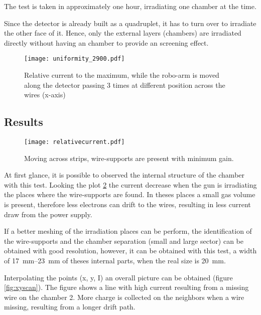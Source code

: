 The test is taken in approximately one hour, irradiating one chamber at the time.\par
Since the detector is already built as a quadruplet, it has to turn over to irradiate the other face of it. Hence, only
the external layers (chambers) are irradiated directly without having an chamber to provide an screening effect.\par

\begin{figure}[ht]
	\centering
	\texttt{[image: uniformity\_2900.pdf]}
	\caption{Relative current to the maximum, while the robo-arm is moved along the detector passing 3 times at different
	position across the wires (x-axis)}\label{}
\end{figure}


\subsection{Results}

\begin{figure}[ht]
	\centering
	\texttt{[image: relativecurrent.pdf]}
	\caption{Moving across strips, wire-supports are present with minimum gain.}\label{fig:structure}
\end{figure}

At first glance, it is possible to observed the internal structure of the chamber with this test. Looking the plot
\ref{fig:structure} the current decrease when the gun is irradiating the places where the wire-supports are found. In
theses places a small gas volume is present, therefore less electrons can drift to the wires, resulting in less current
draw from the power supply.\par
If a better meshing of the irradiation places can be perform, the identification of the wire-supports and the chamber
separation (small and large sector) can be obtained with good resolution, however, it can be obtained with this test, a
width of 
\SIrange{17}{23}{mm} of theses internal parts, when the real size is \SI{20}{mm}.\par

Interpolating the points (x, y, I) an overall picture can be obtained (figure \ref{fig:xyscan}). The figure shows a line
with high current resulting from a missing wire on the chamber 2. More charge is collected on the neighbors when a wire
missing, resulting from a longer drift path.\par


